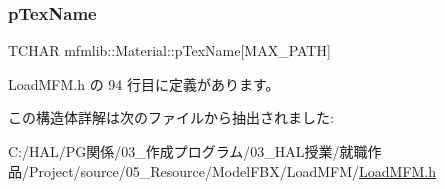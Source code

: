 \subsubsection{\texorpdfstring{p\+Tex\+Name}{pTexName}}
{\footnotesize\ttfamily T\+C\+H\+AR mfmlib\+::\+Material\+::p\+Tex\+Name\mbox{[}M\+A\+X\+\_\+\+P\+A\+TH\mbox{]}}



 Load\+M\+F\+M.\+h の 94 行目に定義があります。



この構造体詳解は次のファイルから抽出されました\+:\begin{DoxyCompactItemize}
\item 
C\+:/\+H\+A\+L/\+P\+G関係/03\+\_\+作成プログラム/03\+\_\+\+H\+A\+L授業/就職作品/\+Project/source/05\+\_\+\+Resource/\+Model\+F\+B\+X/\+Load\+M\+F\+M/\mbox{\hyperlink{_load_m_f_m_8h}{Load\+M\+F\+M.\+h}}\end{DoxyCompactItemize}
